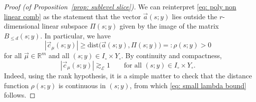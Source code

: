 \documentclass[reqno]{amsart}
\numberwithin{equation}{section}
\newcommand{\R}{\mathbb{R}}
\newcommand{\sE}{\mathscr{E}}
\theoremstyle{plain}
\theoremstyle{definition}
\newcommand{\dist}{\mathrm{dist}}
\begin{document}
\begin{proof}[Proof (of Proposition~\ref{prop: sublevel slice})]
We can reinterpret \eqref{eq: poly non linear comb} as the statement that the vector $\vec{a}(s;y)$ lies outside the $r$-dimensional linear subspace $\Pi(s;y)$ given by the image of the matrix $B_{\le d}(s;y)$. In particular, we have
\begin{equation*}
   |\vec{c}_{\mu}(s;y)| \geq \dist\big(\vec{a}(s;y), \Pi(s;y)\big) =: \rho(s;y) > 0 
\end{equation*}
for all $\vec{\mu} \in \R^m$ and all $(s;y) \in I_{\circ} \times Y_{\circ}$. By continuity and compactness,
\begin{equation}\label{eq: small lambda bound}
    |\vec{c}_{\mu}(s;y)| \gtrsim_{\sE} 1 \qquad \textrm{for all $(s;y) \in I_{\circ} \times Y_{\circ}$.}
\end{equation}
Indeed, using the rank hypothesis, it is a simple matter to check that the distance function $\rho(s;y)$ is continuous in $(s;y)$, from which \eqref{eq: small lambda bound} follows. 


\end{proof}
\end{document}
